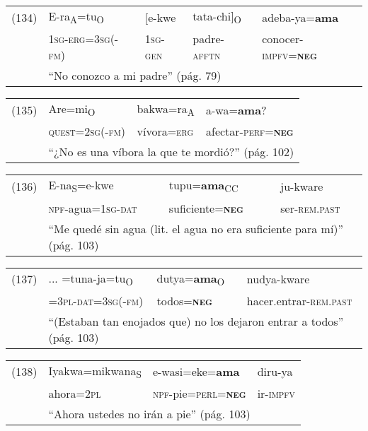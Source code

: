 {\setmainfont{Charis SIL} 

\begin{tabular}{lllll}
(134) & E-ra\textsubscript{A}=tu\textsubscript{O} & [e-kwe & tata-chi]\textsubscript{O} & adeba-ya=\textbf{ama} \\
& \textsc{1sg-erg=3sg(-fm)} & \textsc{1sg-gen} & padre-\textsc{afftn} & conocer-\textsc{impfv=\textbf{neg}} \\
& \multicolumn{4}{l}{``No conozco a mi padre'' (pág. 79)}
\end{tabular} \vspace{0.5cm}

\begin{tabular}{llll}
(135) & Are=mi\textsubscript{O} & bakwa=ra\textsubscript{A} & a-wa=\textbf{ama}? \\
& \textsc{quest=2sg(-fm)} & vívora=\textsc{erg} & afectar-\textsc{perf=\textbf{neg}} \\
& \multicolumn{3}{l}{``¿No es una víbora la que te mordió?'' (pág. 102)}
\end{tabular} \vspace{0.5cm}

\begin{tabular}{llll}
(136) & E-na\textsubscript{S}=e-kwe & tupu=\textbf{ama}\textsubscript{CC} & ju-kware \\
& \textsc{npf-}agua=\textsc{1sg-dat} & suficiente=\textsc{\textbf{neg}} & ser-\textsc{rem.past} \\
& \multicolumn{3}{l}{``Me quedé sin agua (lit. el agua no era suficiente para mí)'' (pág. 103)}
\end{tabular} \vspace{0.5cm}

\begin{tabular}{llll}
(137) & ... =tuna-ja=tu\textsubscript{O} & dutya=\textbf{ama}\textsubscript{O} & nudya-kware \\
& =\textsc{3pl-dat=3sg(-fm)} & todos=\textsc{\textbf{neg}} & hacer.entrar-\textsc{rem.past} \\
& \multicolumn{3}{l}{``(Estaban tan enojados que) no los dejaron entrar a todos'' (pág. 103)}
\end{tabular} \vspace{0.5cm}

\begin{tabular}{llll}
(138) & Iyakwa=mikwana\textsubscript{S} & e-wasi=eke=\textbf{ama} & diru-ya \\
& ahora=\textsc{2pl} & \textsc{npf-}pie=\textsc{perl=\textbf{neg}} & ir-\textsc{impfv} \\
& \multicolumn{3}{l}{``Ahora ustedes no irán a pie'' (pág. 103)}
\end{tabular} \vspace{0.5cm}

}

